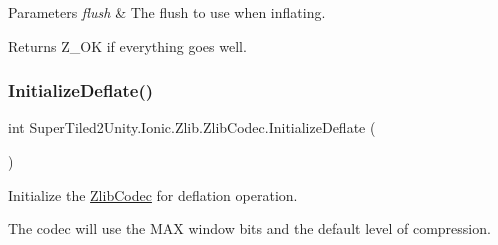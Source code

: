 \begin{DoxyParams}{Parameters}
{\em flush} & The flush to use when inflating.\\
\hline
\end{DoxyParams}
\begin{DoxyReturn}{Returns}
Z\+\_\+\+OK if everything goes well.
\end{DoxyReturn}
\mbox{\label{class_super_tiled2_unity_1_1_ionic_1_1_zlib_1_1_zlib_codec_a8554eab826711fc8aaccfc039cf2f372}} 
\subsubsection{\texorpdfstring{Initialize\+Deflate()}{InitializeDeflate()}\hspace{0.1cm}{\footnotesize\ttfamily [1/5]}}
{\footnotesize\ttfamily int Super\+Tiled2\+Unity.\+Ionic.\+Zlib.\+Zlib\+Codec.\+Initialize\+Deflate (\begin{DoxyParamCaption}{ }\end{DoxyParamCaption})}



Initialize the \mbox{\hyperlink{class_super_tiled2_unity_1_1_ionic_1_1_zlib_1_1_zlib_codec}{Zlib\+Codec}} for deflation operation. 

The codec will use the M\+AX window bits and the default level of compression. 


